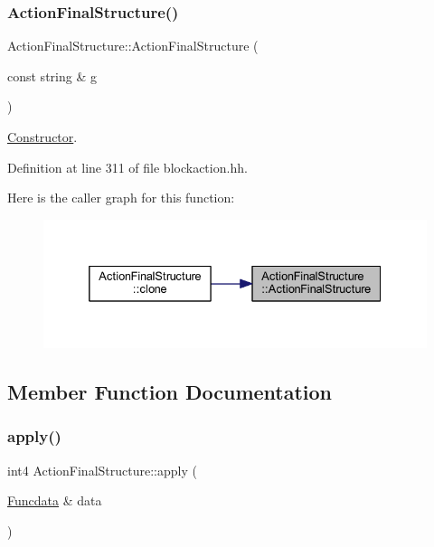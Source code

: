 \subsubsection{\texorpdfstring{ActionFinalStructure()}{ActionFinalStructure()}}
{\footnotesize\ttfamily Action\+Final\+Structure\+::\+Action\+Final\+Structure (\begin{DoxyParamCaption}\item[{const string \&}]{g }\end{DoxyParamCaption})\hspace{0.3cm}{\ttfamily [inline]}}



\mbox{\hyperlink{class_constructor}{Constructor}}. 



Definition at line 311 of file blockaction.\+hh.

Here is the caller graph for this function\+:
\nopagebreak
\begin{figure}[H]
\begin{center}
\leavevmode
\includegraphics[width=332pt]{class_action_final_structure_afdb0cb3d9e262d819705e7b07227a9af_icgraph}
\end{center}
\end{figure}


\subsection{Member Function Documentation}
\mbox{\label{class_action_final_structure_a872ef94df66c1fb7acd17022b739bac2}} 
\subsubsection{\texorpdfstring{apply()}{apply()}}
{\footnotesize\ttfamily int4 Action\+Final\+Structure\+::apply (\begin{DoxyParamCaption}\item[{\mbox{\hyperlink{class_funcdata}{Funcdata}} \&}]{data }\end{DoxyParamCaption})\hspace{0.3cm}{\ttfamily [virtual]}}



